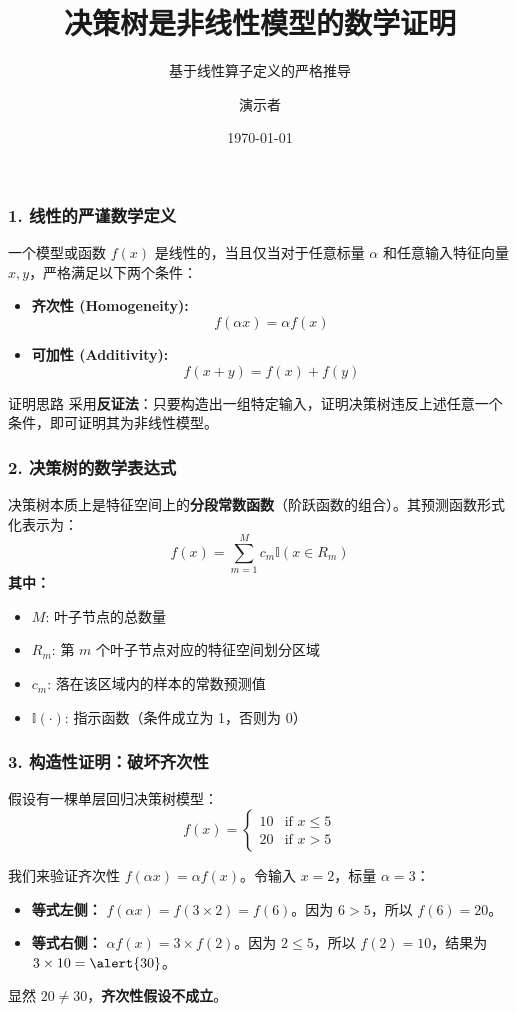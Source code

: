 \documentclass{beamer}
\title{决策树是非线性模型的数学证明}
\subtitle{基于线性算子定义的严格推导}
\author{演示者}
\date{\today}
\begin{document}
\frame{\titlepage}

\begin{frame}
\frametitle{1. 线性的严谨数学定义}
一个模型或函数 $f(x)$ 是线性的，当且仅当对于任意标量 $\alpha$ 和任意输入特征向量 $x, y$，严格满足以下两个条件：
\vspace{0.5cm}
\begin{itemize}
    \item \textbf{齐次性 (Homogeneity):} 
    $$f(\alpha x) = \alpha f(x)$$
    \item \textbf{可加性 (Additivity):} 
    $$f(x + y) = f(x) + f(y)$$
\end{itemize}
\vspace{0.5cm}
\begin{block}{证明思路}
采用\textbf{反证法}：只要构造出一组特定输入，证明决策树违反上述任意一个条件，即可证明其为非线性模型。
\end{block}
\end{frame}

\begin{frame}
\frametitle{2. 决策树的数学表达式}
决策树本质上是特征空间上的\textbf{分段常数函数}（阶跃函数的组合）。其预测函数形式化表示为：
$$f(x) = \sum_{m=1}^{M} c_m \mathbb{I}(x \in R_m)$$
\vspace{0.2cm}
\textbf{其中：}
\begin{itemize}
    \item $M$: 叶子节点的总数量
    \item $R_m$: 第 $m$ 个叶子节点对应的特征空间划分区域
    \item $c_m$: 落在该区域内的样本的常数预测值
    \item $\mathbb{I}(\cdot)$: 指示函数（条件成立为 1，否则为 0）
\end{itemize}
\end{frame}

\begin{frame}
\frametitle{3. 构造性证明：破坏齐次性}
假设有一棵单层回归决策树模型：
\begin{equation*}
f(x) =
\begin{cases}
  10 & \text{if } x \leq 5 \\
  20 & \text{if } x > 5
\end{cases}
\end{equation*}

我们来验证齐次性 $f(\alpha x) = \alpha f(x)$。令输入 $x = 2$，标量 $\alpha = 3$：
\vspace{0.2cm}
\begin{itemize}
    \item \textbf{等式左侧：} $f(\alpha x) = f(3 \times 2) = f(6)$。因为 $6 > 5$，所以 \alert{$f(6) = 20$}。
    \item \textbf{等式右侧：} $\alpha f(x) = 3 \times f(2)$。因为 $2 \leq 5$，所以 $f(2) = 10$，结果为 $3 \times 10 = \alert{30}$。
\end{itemize}
\vspace{0.3cm}
显然 $20 \neq 30$，\textbf{齐次性假设不成立}。
\end{frame}
\end{document}
